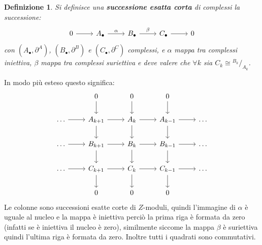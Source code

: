 \documentclass[10pt, twoside=false, x11names]{scrbook}
\newtheorem{definition}[theorem]{Definizione}
\newcommand*\quot[2]{{^{\textstyle #1}\big/_{\textstyle #2}}}
\begin{document}
\begin{definition}
  Si definisce una \textbf{successione esatta corta} di
  complessi la successione:
  \[
    \begin{tikzcd}
      0 \arrow{r}{} & A_\bullet \arrow{r}{\alpha} & B_\bullet \arrow{r}{\beta} & C_\bullet \arrow{r}{} & 0
    \end{tikzcd}
  \]
  con $ (A_\bullet, \partial^A) $, $ (B_\bullet, \partial^B) $ e $ (C_\bullet, \partial^C) $ complessi, e
  $ \alpha $ mappa tra complessi iniettiva, $ \beta $ mappa tra complessi suriettiva
  e deve valere che $ \forall k $ sia $ C_k \cong \quot{B_k}{A_k} $.
\end{definition}


In modo più esteso questo significa:
\[
  \begin{tikzcd}
    {} & 0 \arrow{d}{} & 0 \arrow{d}{} & 0 \arrow{d}{} & {} \\
    \dots \arrow{r}{} & A_{k+1} \arrow{r}{} \arrow{d}{} & A_{k} \arrow{r}{} \arrow{d}{} & A_{k-1} \arrow{r}{} \arrow{d}{} & \dots \\
    \dots \arrow{r}{} & B_{k+1} \arrow{r}{} \arrow{d}{} & B_{k} \arrow{r}{} \arrow{d}{} & B_{k-1} \arrow{r}{} \arrow{d}{} & \dots \\
    \dots \arrow{r}{} & C_{k+1} \arrow{r}{} \arrow{d}{} & C_{k} \arrow{r}{} \arrow{d}{} & C_{k-1} \arrow{r}{} \arrow{d}{} & \dots \\
    {} & 0 & 0 & 0 & {}
  \end{tikzcd}
\]
Le colonne sono successioni esatte corte di $ Z $-moduli, quindi
l'immagine di $ \alpha $ è uguale al nucleo e la mappa è iniettiva
perciò la prima riga è formata da zero (infatti se è
iniettiva il nucleo è zero), similmente siccome
la mappa $ \beta $ è suriettiva quindi l'ultima
riga è formata da zero.
Inoltre tutti i quadrati sono commutativi.
\end{document}
